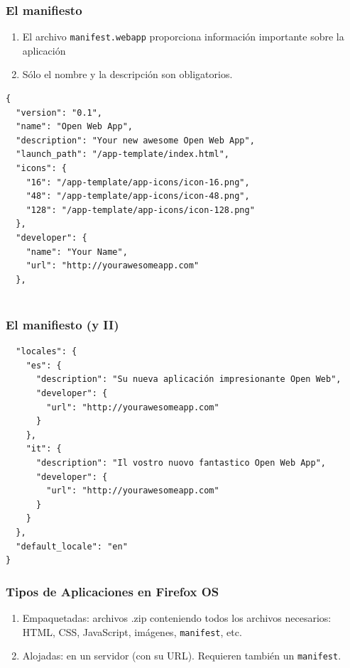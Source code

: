 
\begin{frame}[fragile]
\frametitle{El manifiesto}

\begin{enumerate}
  \item El archivo \texttt{manifest.webapp} proporciona información importante sobre la aplicación
  \item Sólo el nombre y la descripción son obligatorios.
\end{enumerate}

\begin{footnotesize}
\begin{verbatim}
{
  "version": "0.1",
  "name": "Open Web App",
  "description": "Your new awesome Open Web App",
  "launch_path": "/app-template/index.html",
  "icons": {
    "16": "/app-template/app-icons/icon-16.png",
    "48": "/app-template/app-icons/icon-48.png",
    "128": "/app-template/app-icons/icon-128.png"
  },
  "developer": {
    "name": "Your Name",
    "url": "http://yourawesomeapp.com"
  },
  
\end{verbatim}
\end{footnotesize}
\end{frame}
  

\begin{frame}[fragile]
\frametitle{El manifiesto (y II)}  
  
\begin{footnotesize}
\begin{verbatim}
  "locales": {
    "es": {
      "description": "Su nueva aplicación impresionante Open Web",
      "developer": {
        "url": "http://yourawesomeapp.com"
      }
    },
    "it": {
      "description": "Il vostro nuovo fantastico Open Web App",
      "developer": {
        "url": "http://yourawesomeapp.com"
      }
    }
  },
  "default_locale": "en"
}
\end{verbatim}
\end{footnotesize}

\end{frame}


\begin{frame}
\frametitle{Tipos de Aplicaciones en Firefox OS}

\begin{enumerate}
  \item Empaquetadas: archivos .zip  conteniendo todos los archivos necesarios: HTML, CSS, JavaScript, imágenes, \texttt{manifest}, etc.
  \item Alojadas: en un servidor (con su URL). Requieren también un \texttt{manifest}.
\end{enumerate}

\end{frame}


